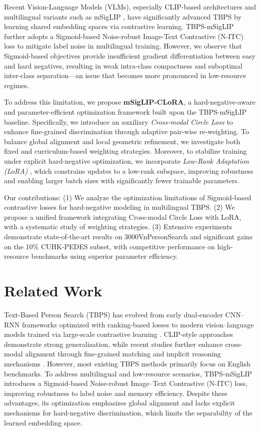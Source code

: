 \documentclass{article}
\begin{document}
Recent Vision-Language Models (VLMs), especially CLIP-based architectures and multilingual variants such as mSigLIP \cite{Zhai_2023_ICCV}, have significantly advanced TBPS by learning shared embedding spaces via contrastive learning. TBPS-mSigLIP \cite{tran2025multilingual} further adopts a Sigmoid-based Noise-robust Image-Text Contrastive (N-ITC) loss to mitigate label noise in multilingual training. However, we observe that Sigmoid-based objectives provide insufficient gradient differentiation between easy and hard negatives, resulting in weak intra-class compactness and suboptimal inter-class separation—an issue that becomes more pronounced in low-resource regimes.

To address this limitation, we propose \textbf{mSigLIP-CLoRA}, a hard-negative-aware and parameter-efficient optimization framework built upon the TBPS-mSigLIP baseline. Specifically, we introduce an auxiliary \textit{Cross-modal Circle Loss} \cite{sun2020circle} to enhance fine-grained discrimination through adaptive pair-wise re-weighting. To balance global alignment and local geometric refinement, we investigate both fixed and curriculum-based weighting strategies. Moreover, to stabilize training under explicit hard-negative optimization, we incorporate \textit{Low-Rank Adaptation (LoRA)} \cite{hu2022lora}, which constrains updates to a low-rank subspace, improving robustness and enabling larger batch sizes with significantly fewer trainable parameters.

Our contributions: (1) We analyze the optimization limitations of Sigmoid-based contrastive losses for hard-negative modeling in multilingual TBPS. (2) We propose a unified framework integrating Cross-modal Circle Loss with LoRA, with a systematic study of weighting strategies. (3) Extensive experiments demonstrate state-of-the-art results on 3000VnPersonSearch and significant gains on the 10\% CUHK-PEDES subset, with competitive performance on high-resource benchmarks using superior parameter efficiency.


\section{Related Work}\label{related}

Text-Based Person Search (TBPS) has evolved from early dual-encoder CNN–RNN frameworks optimized with ranking-based losses \cite{Zhang_2018_ECCV,Li_2017_CVPR} to modern vision--language models trained via large-scale contrastive learning \cite{pmlr-v139-radford21a}. CLIP-style approaches demonstrate strong generalization, while recent studies further enhance cross-modal alignment through fine-grained matching and implicit reasoning mechanisms \cite{jiang2023cross,yin2025cross}. However, most existing TBPS methods primarily focus on English benchmarks. To address multilingual and low-resource scenarios, TBPS-mSigLIP \cite{tran2025multilingual} introduces a Sigmoid-based Noise-robust Image--Text Contrastive (N-ITC) loss, improving robustness to label noise and memory efficiency. Despite these advantages, its optimization emphasizes global alignment and lacks explicit mechanisms for hard-negative discrimination, which limits the separability of the learned embedding space.
\end{document}
